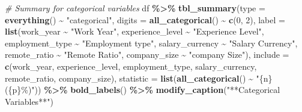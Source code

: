 \documentclass[
]{article}
\newenvironment{Shaded}{\begin{snugshade}}{\end{snugshade}}
\newcommand{\AttributeTok}[1]{\textcolor[rgb]{0.13,0.29,0.53}{#1}}
\newcommand{\CommentTok}[1]{\textcolor[rgb]{0.56,0.35,0.01}{\textit{#1}}}
\newcommand{\DecValTok}[1]{\textcolor[rgb]{0.00,0.00,0.81}{#1}}
\newcommand{\FunctionTok}[1]{\textcolor[rgb]{0.13,0.29,0.53}{\textbf{#1}}}
\newcommand{\NormalTok}[1]{#1}
\newcommand{\SpecialCharTok}[1]{\textcolor[rgb]{0.81,0.36,0.00}{\textbf{#1}}}
\newcommand{\StringTok}[1]{\textcolor[rgb]{0.31,0.60,0.02}{#1}}
\begin{document}
\begin{Shaded}
\begin{Highlighting}[]
\CommentTok{\# Summary for categorical variables }
\NormalTok{df }\SpecialCharTok{\%\textgreater{}\%}
  \FunctionTok{tbl\_summary}\NormalTok{(}\AttributeTok{type =} \FunctionTok{everything}\NormalTok{() }\SpecialCharTok{\textasciitilde{}} \StringTok{"categorical"}\NormalTok{, }
              \AttributeTok{digits =} \FunctionTok{all\_categorical}\NormalTok{() }\SpecialCharTok{\textasciitilde{}} \FunctionTok{c}\NormalTok{(}\DecValTok{0}\NormalTok{, }\DecValTok{2}\NormalTok{), }
              \AttributeTok{label =} \FunctionTok{list}\NormalTok{(work\_year }\SpecialCharTok{\textasciitilde{}} \StringTok{"Work Year"}\NormalTok{, }
\NormalTok{                           experience\_level }\SpecialCharTok{\textasciitilde{}} \StringTok{"Experience Level"}\NormalTok{,}
\NormalTok{                           employment\_type }\SpecialCharTok{\textasciitilde{}} \StringTok{"Employment type"}\NormalTok{,}
\NormalTok{                           salary\_currency }\SpecialCharTok{\textasciitilde{}} \StringTok{"Salary Currency"}\NormalTok{,}
\NormalTok{                           remote\_ratio }\SpecialCharTok{\textasciitilde{}} \StringTok{"Remote Ratio"}\NormalTok{,}
\NormalTok{                           company\_size }\SpecialCharTok{\textasciitilde{}} \StringTok{"company Size"}\NormalTok{),}
              \AttributeTok{include =} \FunctionTok{c}\NormalTok{(work\_year, experience\_level, employment\_type,}
\NormalTok{                          salary\_currency, remote\_ratio, company\_size),}
              \AttributeTok{statistic =} \FunctionTok{list}\NormalTok{(}\FunctionTok{all\_categorical}\NormalTok{() }\SpecialCharTok{\textasciitilde{}} \StringTok{"\{n\} (\{p\}\%)"}\NormalTok{)) }\SpecialCharTok{\%\textgreater{}\%}
  \FunctionTok{bold\_labels}\NormalTok{() }\SpecialCharTok{\%\textgreater{}\%}
  \FunctionTok{modify\_caption}\NormalTok{(}\StringTok{"**Categorical Variables**"}\NormalTok{)}
\end{Highlighting}
\end{Shaded}
\end{document}
